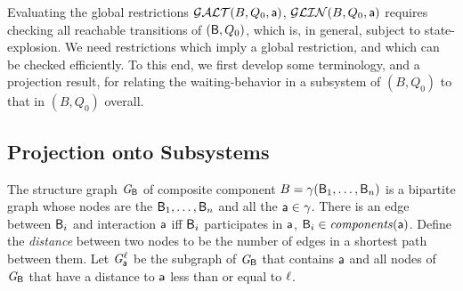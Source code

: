 
   \label{s:local.preamble}
%   

Evaluating the global restrictions $\mathcal{GALT}(B,Q_0,\mathsf{a})$, $\mathcal{GLIN}(B,Q_0,\mathsf{a})$ requires checking all reachable transitions of
$(\mathsf{B}, Q_0)$, which is, in general, subject to state-explosion.
We need restrictions which imply a global restriction, 
and which can be checked efficiently.
%
To this end, we first develop some terminology, and a projection result, for relating the waiting-behavior in a
subsystem of $(B,Q_0)$ to that in $(B,Q_0)$ overall.



\subsection{Projection onto Subsystems}
\label{s:projection}

%



\begin{definition} \label{def:structure-graph} The structure
graph $\mathit{G}_{\mathsf{B}}$ of composite component $B = \gamma(\mathsf{B}_1,\dots,\mathsf{B}_n)$ is a
bipartite graph whose nodes are the $\mathsf{B}_1, \ldots, \mathsf{B}_n$ and all the
$\mathsf{a} \in \gamma$.  There is an edge between $\mathsf{B}_i$ and
interaction $\mathsf{a}$ iff $\mathsf{B}_i$ participates in $\mathsf{a}$, \ie $\mathsf{B}_i \in \mathit{components}(\mathsf{a})$.  Define the
\emph{distance} between two nodes to be the number of edges in a shortest path
between them.  Let $\mathit{G}_{\mathsf{a}}^{\ell}$ be the subgraph
of $\mathit{G}_{\mathsf{B}}$ that contains $\mathsf{a}$ and all nodes of $\mathit{G}_{\mathsf{B}}$
that have a distance to $\mathsf{a}$ less than or equal to $\ell$.
\end{definition}


